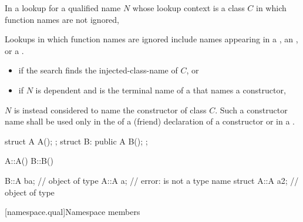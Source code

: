 \pnum
In a lookup for a qualified name $N$ whose lookup context is a class $C$
in which function names are not ignored,
\begin{footnote}
Lookups in which
function names are ignored include names appearing in a
, an
, or a .
\end{footnote}
\begin{itemize}
\item
if the search finds the injected-class-name of $C$, or
\item
if $N$ is dependent and
is the terminal name of a 
that names a constructor,
\end{itemize}
$N$ is instead considered to name the constructor of class $C$.
Such a constructor name shall be used only
in the  of a (friend) declaration of a constructor or
in a .
\begin{example}
\begin{codeblock}
struct A { A(); };
struct B: public A { B(); };

A::A() { }
B::B() { }

B::A ba;            // object of type 
A::A a;             // error:  is not a type name
struct A::A a2;     // object of type 
\end{codeblock}
\end{example}

[namespace.qual]{Namespace members}

